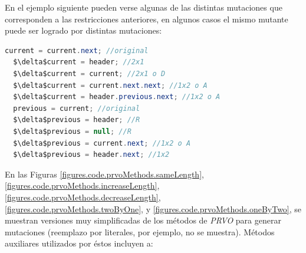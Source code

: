En el ejemplo siguiente pueden verse algunas de las distintas mutaciones que corresponden a las restricciones anteriores, en algunos casos el mismo mutante puede ser logrado por distintas mutaciones:
\begin{lstlisting}[mathescape=true,language=Java,basicstyle={}]
  current = current.next; //original
  $\delta$current = header; //2x1
  $\delta$current = current; //2x1 o D 
  $\delta$current = current.next.next; //1x2 o A
  $\delta$current = header.previous.next; //1x2 o A
  previous = current; //original
  $\delta$previous = header; //R
  $\delta$previous = null; //R
  $\delta$previous = current.next; //1x2 o A
  $\delta$previous = header.next; //1x2
\end{lstlisting}

En las Figuras \ref{figures.code.prvoMethods.sameLength}, \ref{figures.code.prvoMethods.increaseLength}, \ref{figures.code.prvoMethods.decreaseLength}, \ref{figures.code.prvoMethods.twoByOne}, y \ref{figures.code.prvoMethods.oneByTwo}, se muestran versiones muy simplificadas de los m\'etodos de \emph{PRVO} para generar mutaciones (reemplazo por literales, por ejemplo, no se muestra). M\'etodos auxiliares utilizados por \'estos incluyen a:

